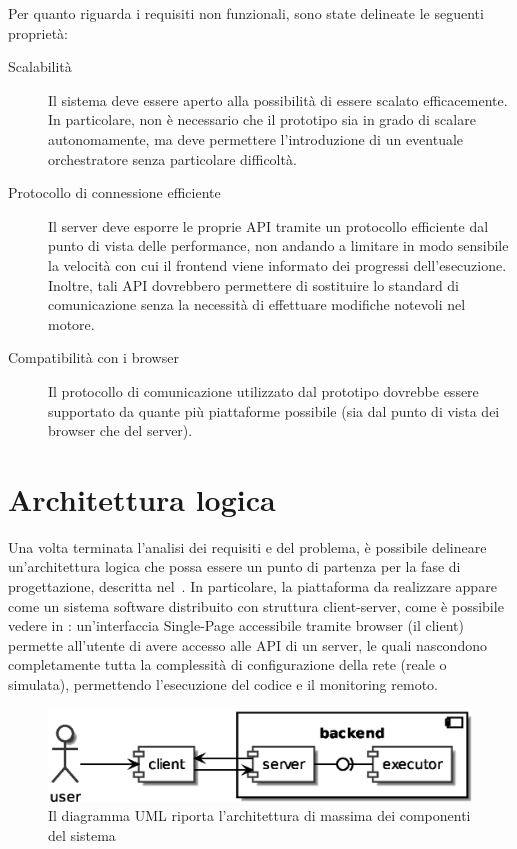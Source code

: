       Per quanto riguarda i requisiti non funzionali, sono state delineate le seguenti proprietà:

      \begin{description}
        \item[Scalabilità]
          Il sistema deve essere aperto alla possibilità di essere scalato efficacemente.
          In particolare, non è necessario che il prototipo sia in grado di scalare autonomamente, ma deve permettere l'introduzione di un eventuale orchestratore senza particolare difficoltà.

        \item[Protocollo di connessione efficiente]
          Il server deve esporre le proprie API tramite un protocollo efficiente dal punto di vista delle performance, non andando a limitare in modo sensibile la velocità con cui il frontend viene informato dei progressi dell'esecuzione.
          Inoltre, tali API dovrebbero permettere di sostituire lo standard di comunicazione senza la necessità di effettuare modifiche notevoli nel motore.

        \item[Compatibilità con i browser]
          Il protocollo di comunicazione utilizzato dal prototipo dovrebbe essere supportato da quante più piattaforme possibile (sia dal punto di vista dei browser che del server).
      \end{description}

  \section{Architettura logica}\label{sec:arch-logica}

  Una volta terminata l'analisi dei requisiti e del problema, è possibile delineare un'architettura logica che possa essere un punto di partenza per la fase di progettazione, descritta nel~.
  In particolare, la piattaforma da realizzare appare come un sistema software distribuito con struttura client-server, come è possibile vedere in :
  un'interfaccia Single-Page accessibile tramite browser (il client) permette all'utente di avere accesso alle API di un server, le quali nascondono completamente tutta la complessità di configurazione della rete (reale o simulata), permettendo l'esecuzione del codice e il monitoring remoto.

  \begin{figure}[htbp]
    \centering
    \includegraphics[width=.8\textwidth]{res/uml/architecture-design.eps}%
    \caption{Il diagramma UML riporta l'architettura di massima dei componenti del sistema}%
    \label{fig:architecture-design}
  \end{figure}
